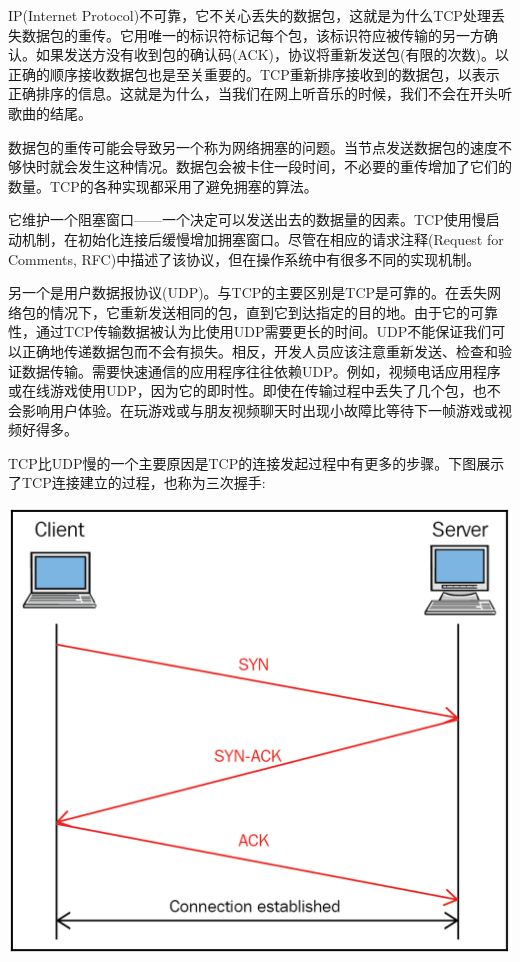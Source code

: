 IP(Internet Protocol)不可靠，它不关心丢失的数据包，这就是为什么TCP处理丢失数据包的重传。它用唯一的标识符标记每个包，该标识符应被传输的另一方确认。如果发送方没有收到包的确认码(ACK)，协议将重新发送包(有限的次数)。以正确的顺序接收数据包也是至关重要的。TCP重新排序接收到的数据包，以表示正确排序的信息。这就是为什么，当我们在网上听音乐的时候，我们不会在开头听歌曲的结尾。 \par
数据包的重传可能会导致另一个称为网络拥塞的问题。当节点发送数据包的速度不够快时就会发生这种情况。数据包会被卡住一段时间，不必要的重传增加了它们的数量。TCP的各种实现都采用了避免拥塞的算法。 \par
它维护一个阻塞窗口——一个决定可以发送出去的数据量的因素。TCP使用慢启动机制，在初始化连接后缓慢增加拥塞窗口。尽管在相应的请求注释(Request for Comments, RFC)中描述了该协议，但在操作系统中有很多不同的实现机制。 \par
另一个是用户数据报协议(UDP)。与TCP的主要区别是TCP是可靠的。在丢失网络包的情况下，它重新发送相同的包，直到它到达指定的目的地。由于它的可靠性，通过TCP传输数据被认为比使用UDP需要更长的时间。UDP不能保证我们可以正确地传递数据包而不会有损失。相反，开发人员应该注意重新发送、检查和验证数据传输。需要快速通信的应用程序往往依赖UDP。例如，视频电话应用程序或在线游戏使用UDP，因为它的即时性。即使在传输过程中丢失了几个包，也不会影响用户体验。在玩游戏或与朋友视频聊天时出现小故障比等待下一帧游戏或视频好得多。 \par
TCP比UDP慢的一个主要原因是TCP的连接发起过程中有更多的步骤。下图展示了TCP连接建立的过程，也称为三次握手: \par

\begin{center}
	\includegraphics[width=1.0\textwidth]{content/Section-2/Chapter-12/8}
\end{center}

